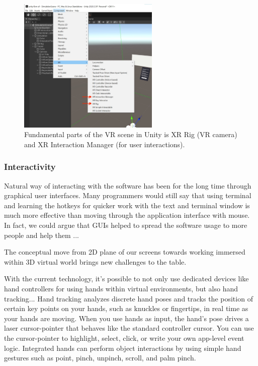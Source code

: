 \begin{figure}[!ht]
	\centering
	\includegraphics[width=0.6\textwidth]{figures/unity-add-xr-objects.jpg}
	\caption{Fundamental parts of the VR scene in Unity is XR Rig (VR camera) and XR Interaction Manager (for user interactions).}
	\label{fig:unity-xr-objects}
\end{figure}

\subsubsection{Interactivity}\label{sec:interactivity}

Natural way of interacting with the software has been for the long time through graphical user interfaces. Many programmers would still say that using terminal and learning the hotkeys for quicker work with the text and terminal window is much more effective than moving through the application interface with mouse. In fact, we could argue that GUIs helped to spread the software usage to more people and help them ... 

The conceptual move from 2D plane of our screens towards working immersed within 3D virtual world brings new challenges to the table. 

With the current technology, it's possible to not only use dedicated devices like hand controllers for using hands within virtual environments, but also hand tracking... %
Hand tracking analyzes discrete hand poses and tracks the position of certain key points on your hands, such as knuckles or fingertips, in real time as your hands are moving. When you use hands as input, the hand’s pose drives a laser cursor-pointer that behaves like the standard controller cursor. You can use the cursor-pointer to highlight, select, click, or write your own app-level event logic. Integrated hands can perform object interactions by using simple hand gestures such as point, pinch, unpinch, scroll, and palm pinch.

